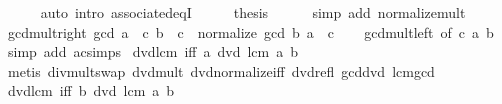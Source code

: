 \begin{isabellebody}
\ \ \ \ \isamarkupfalse%
\ {\isacharparenleft}{\kern0pt}auto\ intro{\isacharcolon}{\kern0pt}\ associated{\isacharunderscore}{\kern0pt}eqI{\isacharparenright}{\kern0pt}\isanewline
\ \ \isamarkupfalse%
\ \isamarkupfalse%
\ {\isacharquery}{\kern0pt}thesis\isanewline
\ \ \ \ \isamarkupfalse%
\ {\isacharparenleft}{\kern0pt}simp\ add{\isacharcolon}{\kern0pt}\ normalize{\isacharunderscore}{\kern0pt}mult{\isacharparenright}{\kern0pt}\isanewline
{}\isamarkupfalse%
%
\endisatagproof
{\isafoldproof}%
%
\isadelimproof
\isanewline
%
\endisadelimproof
\isanewline
{}\isamarkupfalse%
\ gcd{\isacharunderscore}{\kern0pt}mult{\isacharunderscore}{\kern0pt}right{\isacharcolon}{\kern0pt}\ {\isachardoublequoteopen}gcd\ {\isacharparenleft}{\kern0pt}a\ {\isacharasterisk}{\kern0pt}\ c{\isacharparenright}{\kern0pt}\ {\isacharparenleft}{\kern0pt}b\ {\isacharasterisk}{\kern0pt}\ c{\isacharparenright}{\kern0pt}\ {\isacharequal}{\kern0pt}\ normalize\ {\isacharparenleft}{\kern0pt}gcd\ b\ a\ {\isacharasterisk}{\kern0pt}\ c{\isacharparenright}{\kern0pt}{\isachardoublequoteclose}\isanewline
%
\isadelimproof
\ \ %
\endisadelimproof
%
\isatagproof
{}\isamarkupfalse%
\ gcd{\isacharunderscore}{\kern0pt}mult{\isacharunderscore}{\kern0pt}left\ {\isacharbrackleft}{\kern0pt}of\ c\ a\ b{\isacharbrackright}{\kern0pt}\ \isamarkupfalse%
\ {\isacharparenleft}{\kern0pt}simp\ add{\isacharcolon}{\kern0pt}\ ac{\isacharunderscore}{\kern0pt}simps{\isacharparenright}{\kern0pt}%
\endisatagproof
{\isafoldproof}%
%
\isadelimproof
\isanewline
%
\endisadelimproof
\isanewline
{}\isamarkupfalse%
\ dvd{\isacharunderscore}{\kern0pt}lcm{}\ {\isacharbrackleft}{\kern0pt}iff{\isacharbrackright}{\kern0pt}{\isacharcolon}{\kern0pt}\ {\isachardoublequoteopen}a\ dvd\ lcm\ a\ b{\isachardoublequoteclose}\isanewline
%
\isadelimproof
\ \ %
\endisadelimproof
%
\isatagproof
{}\isamarkupfalse%
\ {\isacharparenleft}{\kern0pt}metis\ div{\isacharunderscore}{\kern0pt}mult{\isacharunderscore}{\kern0pt}swap\ dvd{\isacharunderscore}{\kern0pt}mult{}\ dvd{\isacharunderscore}{\kern0pt}normalize{\isacharunderscore}{\kern0pt}iff\ dvd{\isacharunderscore}{\kern0pt}refl\ gcd{\isacharunderscore}{\kern0pt}dvd{}\ lcm{\isacharunderscore}{\kern0pt}gcd{\isacharparenright}{\kern0pt}%
\endisatagproof
{\isafoldproof}%
%
\isadelimproof
\isanewline
%
\endisadelimproof
\isanewline
{}\isamarkupfalse%
\ dvd{\isacharunderscore}{\kern0pt}lcm{}\ {\isacharbrackleft}{\kern0pt}iff{\isacharbrackright}{\kern0pt}{\isacharcolon}{\kern0pt}\ {\isachardoublequoteopen}b\ dvd\ lcm\ a\ b{\isachardoublequoteclose}\isanewline

\end{isabellebody}
